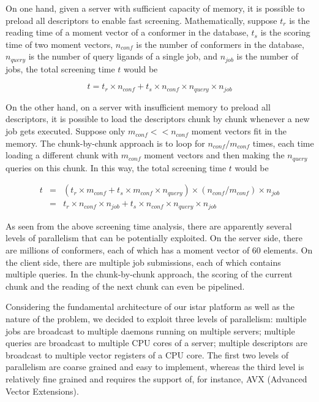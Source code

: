 On one hand, given a server with sufficient capacity of memory, it is possible to preload all descriptors to enable fast screening. Mathematically, suppose $t_r$ is the reading time of a moment vector of a conformer in the database, $t_s$ is the scoring time of two moment vectors, $n_{conf}$ is the number of conformers in the database, $n_{query}$ is the number of query ligands of a single job, and $n_{job}$ is the number of jobs, the total screening time $t$ would be

\begin{equation}
t=t_r\times n_{conf}+t_s\times n_{conf}\times n_{query}\times n_{job}
\label{usr:time0}
\end{equation}

On the other hand, on a server with insufficient memory to preload all descriptors, it is possible to load the descriptors chunk by chunk whenever a new job gets executed. Suppose only $m_{conf} << n_{conf}$ moment vectors fit in the memory. The chunk-by-chunk approach is to loop for $n_{conf}/m_{conf}$ times, each time loading a different chunk with $m_{conf}$ moment vectors and then making the $n_{query}$ queries on this chunk. In this way, the total screening time $t$ would be

\begin{eqnarray}
t&=&(t_r\times m_{conf}+t_s\times m_{conf}\times n_{query})\times(n_{conf}/m_{conf})\times n_{job}\nonumber\\
 &=&t_r\times n_{conf}\times n_{job}+t_s\times n_{conf}\times n_{query}\times n_{job}
\label{usr:time1}
\end{eqnarray}

As seen from the above screening time analysis, there are apparently several levels of parallelism that can be potentially exploited. On the server side, there are millions of conformers, each of which has a moment vector of 60 elements. On the client side, there are multiple job submissions, each of which contains multiple queries. In the chunk-by-chunk approach, the scoring of the current chunk and the reading of the next chunk can even be pipelined.

Considering the fundamental architecture of our istar platform \citep{1362} as well as the nature of the problem, we decided to exploit three levels of parallelism: multiple jobs are broadcast to multiple daemons running on multiple servers; multiple queries are broadcast to multiple CPU cores of a server; multiple descriptors are broadcast to multiple vector registers of a CPU core. The first two levels of parallelism are coarse grained and easy to implement, whereas the third level is relatively fine grained and requires the support of, for instance, AVX (Advanced Vector Extensions).


